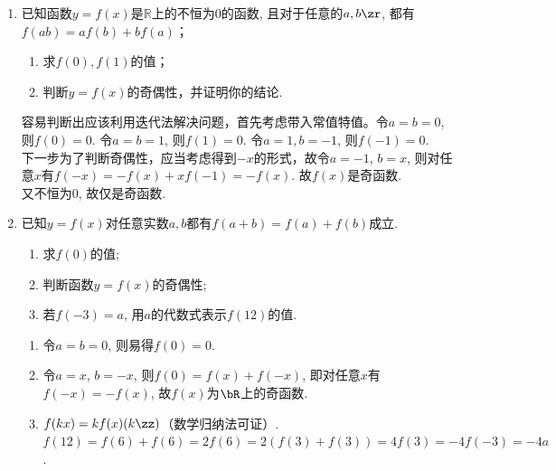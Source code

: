 \begin{enumerate}
\begin{enumerate}
\item 已知$f(x)$是偶函数, $g(x)$是奇函数, $f(x)+g(x)=x^2+x-2$, 求$f(x)$与$g(x)$的解析式. 
\begin{jieda}
$f(-x)+g(-x)=(-x)^2+(-x)-2$, 则$f(x)-g(x)=x^2-x-2$, 于是$\begin{cases}
f(x)+g(x)=x^2+x-2\\
f(x)-g(x)=x^2-x-2
\end{cases}$. \\
解得$f(x)=x^2-2$, $g(x)=x$. \\
\ps 第一步若不理解, 那么令$h(x)=f(x)+g(x)$. \\
另外, $f(x)=\dfrac{f(x)+f(-x)}{2}+\dfrac{f(x)-f(-x)}{2}$. ``什么都没变, 却有了不同''. 
\end{jieda}
\end{enumerate}

\begin{vspace_}
   \vsp[5] 
\end{vspace_}


\item 已知函数$y=f(x)$是$\mathbb{R}$上的不恒为0的函数, 且对于任意的$a,b\zr$, 都有$f(ab)=af(b)+bf(a)$；
\begin{enumerate}
    \item 求$f(0), f(1)$的值；
    \item 判断$y=f(x)$的奇偶性，并证明你的结论. 
\end{enumerate}
\begin{jieda}
容易判断出应该利用迭代法解决问题，首先考虑带入常值特值。令$a=b=0$, 则$f(0)=0$. 令$a=b=1$, 则$f(1)=0$. 令$a=1, b=-1$, 则$f(-1)=0$. \\
下一步为了判断奇偶性，应当考虑得到$-x$的形式，故令$a=-1$, $b=x$, 则对任意$x$有$f(-x)=-f(x)+xf(-1)=-f(x)$. 故$f(x)$是奇函数. \\
又不恒为0, 故仅是奇函数. 
\end{jieda}

\begin{vspace_}
   \vsp[5] 
\end{vspace_}

\item 已知$y=f(x)$对任意实数$a,b$都有$f(a+b)=f(a)+f(b)$成立. 
\begin{enumerate}[(1)]
\item 求$f(0)$的值; 
\item 判断函数$y=f(x)$的奇偶性; 
\item 若$f(-3)=a$, 用$a$的代数式表示$f(12)$的值. 
\end{enumerate}
\begin{jieda}
\begin{enumerate}
\item 令$a=b=0$, 则易得$f(0)=0$. 
\item 令$a=x$, $b=-x$, 则$f(0)=f(x)+f(-x)$, 即对任意$x$有$f(-x)=-f(x)$, 故$f(x)$为$\bR$上的奇函数. 
\item $f(kx)=kf(x)(k\zz)$（数学归纳法可证）. \\
$f(12)=f(6)+f(6)=2f(6)=2(f(3)+f(3))=4f(3)=-4f(-3)=-4a$. 
\end{enumerate}
\end{jieda}


\end{enumerate}
